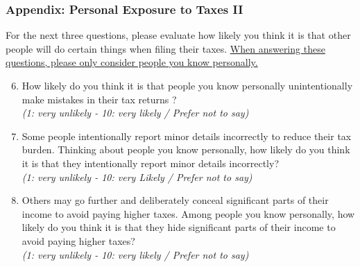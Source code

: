 \documentclass{beamer}
\begin{document}
\begin{frame}
\frametitle{Appendix: Personal Exposure to Taxes II}
\footnotesize
For the next three questions, please evaluate how likely you think it is that other people will do certain things when filing their taxes. \uline{When answering these questions, please only consider people you know personally.} 
\begin{enumerate}
    \setcounter{enumi}{5}
    \item How likely do you think it is that people you know personally unintentionally make mistakes in their tax returns ? \\
    \textit{(1: very unlikely - 10: very likely / Prefer not to say)}
    \item Some people intentionally report minor details incorrectly to reduce their tax burden. Thinking about people you know personally, how likely do you think it is that they intentionally report minor details incorrectly?\\
    \textit{(1: very unlikely - 10: very Likely / Prefer not to say)}
    \item Others may go further and deliberately conceal significant parts of their income to avoid paying higher taxes. Among people you know personally, how likely do you think it is that they hide significant parts of their income to avoid paying higher taxes?\\
    \textit{(1: very unlikely - 10: very likely / Prefer not to say)}
\end{enumerate}
\vfill
\hfill
\hyperlink{Personal_Exposure}{}
\end{frame}
\end{document}
